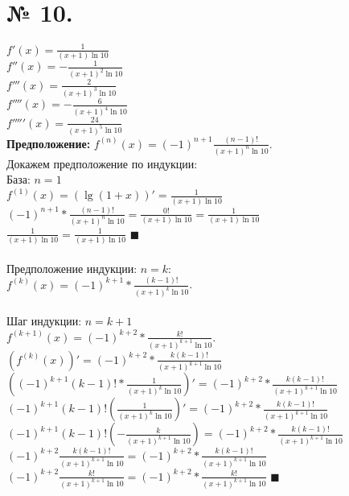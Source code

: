 \documentclass[a4paper,12pt]{report}
\begin{document}
\section{№ 10.}
$f'(x) = \frac{1}{(x + 1)\ln{10}}$\\
$f''(x) = -\frac{1}{(x + 1)^2\ln{10}}$\\
$f'''(x) = \frac{2}{(x + 1)^3\ln{10}}$\\
$f''''(x) = -\frac{6}{(x + 1)^4\ln{10}}$\\
$f'''''(x) = \frac{24}{(x + 1)^5\ln{10}}$\\
\textbf{Предположение:} $f^{(n)}(x) = (-1)^{n + 1}\frac{(n - 1)!}{(x + 1)^n\ln{10}}$.\\
Докажем предположение по индукции:\\
База: $n = 1$\\
$f^{(1)}(x) = (\lg(1 + x))' = \frac{1}{(x + 1)\ln{10}}$\\
$(-1)^{n + 1} * \frac{(n - 1)!}{(x + 1)^n\ln{10}} = \frac{0!}{(x + 1)\ln{10}} = \frac{1}{(x + 1)\ln{10}}$\\
$\frac{1}{(x + 1)\ln{10}} = \frac{1}{(x + 1)\ln{10}}$ $ \blacksquare$\\
\\
Предположение индукции: $n = k$:\\
$f^{(k)}(x) = (-1)^{k + 1} * \frac{(k - 1)!}{(x + 1)^k\ln{10}}$.\\
\\
Шаг индукции: $n = k +1$\\
$f^{(k + 1)}(x) = (-1)^{k + 2} * \frac{k!}{(x + 1)^{k + 1}\ln{10}}$.\\
$(f^{(k)}(x))' = (-1)^{k + 2} * \frac{k(k - 1)!}{(x + 1)^{k + 1}\ln{10}}$\\
$((-1)^{k + 1}(k - 1)! * \frac{1}{(x + 1)^k\ln{10}})' = (-1)^{k + 2} * \frac{k(k - 1)!}{(x + 1)^{k + 1}\ln{10}}$\\
$(-1)^{k + 1}(k - 1)!(\frac{1}{(x + 1)^k\ln{10}})' = (-1)^{k + 2} * \frac{k(k - 1)!}{(x + 1)^{k + 1}\ln{10}}$\\
$(-1)^{k + 1}(k - 1)!(-\frac{k}{(x + 1)^{k + 1}\ln{10}}) = (-1)^{k + 2} * \frac{k(k - 1)!}{(x + 1)^{k + 1}\ln{10}}$\\
$(-1)^{k + 2}\frac{k(k - 1)!}{(x + 1)^{k + 1}\ln{10}} = (-1)^{k + 2} * \frac{k(k - 1)!}{(x + 1)^{k + 1}\ln{10}}$\\
$(-1)^{k + 2}\frac{k!}{(x + 1)^{k + 1}\ln{10}} = (-1)^{k + 2} * \frac{k!}{(x + 1)^{k + 1}\ln{10}}$ $ \blacksquare$\\ 
\end{document}
